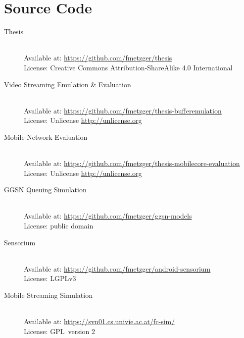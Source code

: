 \chapter*{Source Code}
%

\begin{description}
	\item[Thesis]\hfill \\
	Available at: \url{https://github.com/fmetzger/thesis} \\
	License: Creative Commons Attribution-ShareAlike 4.0 International \cite{ccbysa40}

	\item[Video Streaming Emulation \& Evaluation]\hfill \\
	Available at: \url{https://github.com/fmetzger/thesis-bufferemulation} \\
	License: Unlicense \url{http://unlicense.org}

	\item[Mobile Network Evaluation]\hfill \\
	Available at: \url{https://github.com/fmetzger/thesis-mobilecore-evaluation}  \\
	License: Unlicense \url{http://unlicense.org}

	\item[GGSN Queuing Simulation]\hfill \\
	Available at: \url{https://github.com/fmetzger/ggsn-models} \\
	License: public domain

	\item[Sensorium]\hfill \\
	Available at: \url{https://github.com/fmetzger/android-sensorium} \\
	License: \gls{LGPLv3}~\cite{lgplv3}

	\item[Mobile Streaming Simulation]\hfill \\
	Available at: \url{https://svn01.cs.univie.ac.at/fc-sim/}  \\
	License: \gls{GPL}~version 2~\cite{gplv2}

\end{description}